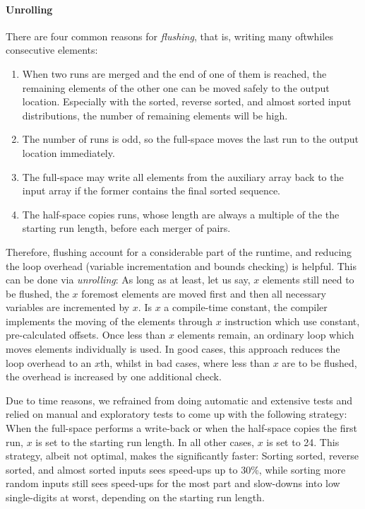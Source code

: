 \paragraph{Unrolling}
There are four common reasons for \emph{flushing}, that is, writing \Dash many oftwhiles \Dash consecutive elements:
\begin{enumerate}
	\item
	When two runs are merged and the end of one of them is reached, the remaining elements of the other one can be moved safely to the output location.
	Especially with the sorted, reverse sorted, and almost sorted input distributions, the number of remaining elements will be high.

	\item
	The number of runs is odd, so the full-space \MS{} moves the last run to the output location immediately.

	\item
	The full-space \MS{} may write all elements from the auxiliary array back to the input array if the former contains the final sorted sequence.

	\item
	The half-space \MS{} copies runs, whose length are always a multiple of the the starting run length, before each merger of pairs.
\end{enumerate}
Therefore, flushing account for a considerable part of the runtime, and reducing the loop overhead (variable incrementation and bounds checking) is helpful.
This can be done via \emph{unrolling}:
As long as at least, let us say, \(x\) elements still need to be flushed, the \(x\) foremost elements are moved first and then all necessary variables are incremented by \(x\).
Is \(x\) a compile-time constant, the compiler implements the moving of the elements through \(x\) instruction which use constant, pre-calculated offsets.
Once less than \(x\) elements remain, an ordinary loop which moves elements individually is used.
In good cases, this approach reduces the loop overhead to an \(x\)th, whilst in bad cases, where less than \(x\) are to be flushed, the overhead is increased by one additional check.

Due to time reasons, we refrained from doing automatic and extensive tests and relied on manual and exploratory tests to come up with the following strategy:
When the full-space \MS{} performs a write-back or when the half-space \MS{} copies the first run, \(x\) is set to the starting run length.
In all other cases, \(x\) is set to 24.
This strategy, albeit not optimal, makes the \MS*{} significantly faster:
Sorting sorted, reverse sorted, and almost sorted inputs sees speed-ups up to 30\%, while sorting more random inputs still sees speed-ups for the most part and slow-downs into low single-digits at worst, depending on the starting run length.




